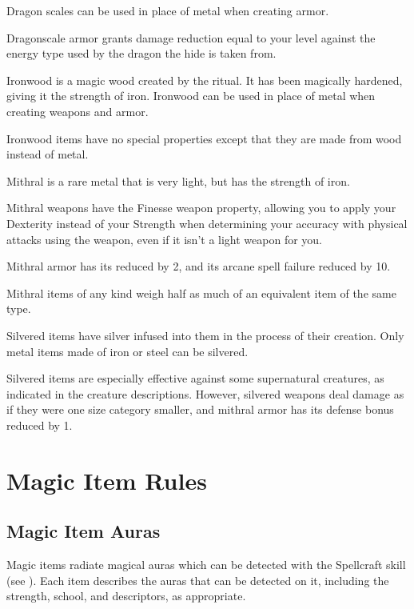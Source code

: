 
        Dragon scales can be used in place of metal when creating armor.

        Dragonscale armor grants damage reduction equal to your level against the energy type used by the dragon the hide is taken from.

        Ironwood is a magic wood created by the  ritual.
        It has been magically hardened, giving it the strength of iron.
        Ironwood can be used in place of metal when creating weapons and armor.

        Ironwood items have no special properties except that they are made from wood instead of metal.

        Mithral is a rare metal that is very light, but has the strength of iron.

        Mithral weapons have the Finesse weapon property, allowing you to apply your Dexterity instead of your Strength when determining your accuracy with physical attacks using the weapon, even if it isn't a light weapon for you.

        Mithral armor has its  reduced by 2, and its arcane spell failure reduced by 10.

        Mithral items of any kind weigh half as much of an equivalent item of the same type.


        Silvered items have silver infused into them in the process of their creation.
        Only metal items made of iron or steel can be silvered.

        Silvered items are especially effective against some supernatural creatures, as indicated in the creature descriptions.
        However, silvered weapons deal damage as if they were one size category smaller, and mithral armor has its defense bonus reduced by 1.

\section{Magic Item Rules}

    \subsection{Magic Item Auras}

        Magic items radiate magical auras which can be detected with the Spellcraft skill (see ).
        Each item describes the auras that can be detected on it, including the strength, school, and descriptors, as appropriate.

